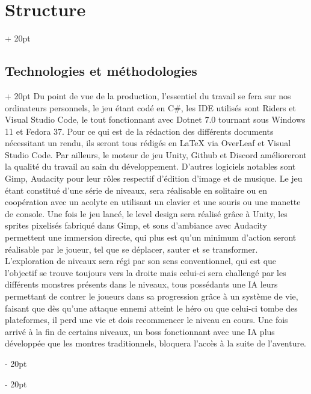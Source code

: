 \documentclass[a4paper, 12pt, twoside]{article}
\newcommand{\ind}[1][20pt]{\advance\leftskip + #1}
\newcommand{\deind}[1][20pt]{\advance\leftskip - #1}
\newenvironment{indt}[2][20pt]{#2 \par \ind[#1]}{\par \deind} %
\begin{document}
    \begin{indt}{\section{Structure}}
        \begin{indt}{\subsection{Technologies et méthodologies}}
            Du point de vue de la production, l'essentiel du travail se fera sur nos ordinateurs personnels, le jeu étant codé en C$\#$, les IDE utilisés sont Riders et Visual Studio Code, le tout fonctionnant avec Dotnet 7.0 tournant sous Windows 11 et Fedora 37. Pour ce qui est de la rédaction des différents documents nécessitant un rendu, ils seront tous rédigés en LaTeX via OverLeaf et Visual Studio Code. Par ailleurs, le moteur de jeu Unity, Github et Discord amélioreront la qualité du travail au sain du développement. D'autres logiciels notables sont Gimp, Audacity pour leur rôles respectif d'édition d'image et de musique. Le jeu étant constitué d'une série de niveaux, sera réalisable en solitaire ou en coopération avec un acolyte en utilisant un clavier et une souris ou une manette de console. Une fois le jeu lancé, le level design sera réalisé grâce à Unity, les sprites pixelisés fabriqué dans Gimp, et sons d'ambiance avec Audacity permettent une immersion directe, qui plus est qu'un minimum d'action seront réalisable par le joueur, tel que se déplacer, sauter et se transformer. L'exploration de niveaux sera régi par son sens conventionnel, qui est que l'objectif se trouve toujours vers la droite mais celui-ci sera challengé par les différents monstres présents dans le niveaux, tous possédants une IA leurs permettant de contrer le joueurs dans sa progression grâce à un système de vie, faisant que dès qu'une attaque ennemi atteint le héro ou que celui-ci tombe des plateformes, il perd une vie et dois recommencer le niveau en cours. Une fois arrivé à la fin de certains niveaux, un boss fonctionnant avec une IA plus développée que les montres traditionnels, bloquera l'accès à la suite de l'aventure.
        \end{indt}


\end{indt}
\end{document}
